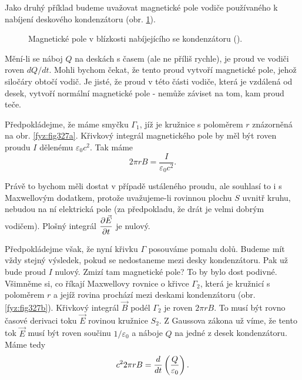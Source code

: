   Jako druhý příklad budeme uvažovat magnetické pole vodiče používaného k nabíjení deskového 
  kondenzátoru (obr. \ref{fyz:fig327}).
  
  \begin{figure}[hb!]  %
    \centering
     \newline
    \caption{Magnetické pole v blízkosti nabíjejícího se kondenzátoru 
             (\cite[s.~321]{Feynman02}).}
    \label{fyz:fig327}
  \end{figure}
  
  Mění-li se náboj \(Q\) na deskách s časem (ale ne příliš rychle), je proud ve vodiči roven 
  \(dQ/dt\). Mohli bychom čekat, že tento proud vytvoří magnetické pole, jehož siločáry obtočí 
  vodič. Je jisté, že proud v této části vodiče, která je vzdálená od desek, vytvoří normální 
  magnetické pole - nemůže záviset na tom, kam proud teče.
  
  Předpokládejme, že máme smyčku \(\Gamma_1\), jíž je kružnice s poloměrem \(r\) znázorněná na obr. 
  \ref{fyz:fig327a}. Křivkový integrál magnetického pole by měl být roven proudu \(I\) dělenému 
  \(\varepsilon_0c^2\). Tak máme
  \begin{equation}\label{fyz:eq445}
    2\pi r B = \frac{I}{\varepsilon_0c^2}.
  \end{equation}
  
  Právě to bychom měli dostat v případě ustáleného proudu, ale souhlasí to i s Maxwellovým 
  dodatkem, protože uvažujeme-li rovinnou plochu \(S\) uvnitř kruhu, nebudou na ní elektrická pole 
  (za předpokladu, že drát je velmi dobrým vodičem). Plošný integrál \(\dfrac{\partial \vec{E}}{\partial t}\) je 
  nulový.
  
  Předpokládejme však, že nyní křivku \(\Gamma\) posouváme pomalu dolů. Budeme mít vždy stejný 
  výsledek, pokud se nedostaneme mezi desky kondenzátoru. Pak už bude proud \(I\) nulový. Zmizí tam 
  magnetické pole? To by bylo dost podivné. Všimněme si, co říkají Maxwellovy rovnice o křivce 
  \(\Gamma_2\), která je kružnicí s poloměrem \(r\) a jejíž rovina prochází mezi deskami 
  kondenzátoru (obr. \ref{fyz:fig327b}). Křivkový integrál \(\vec{B}\) podél \(\Gamma_2\) je roven 
  \(2\pi rB\). To musí být rovno časové derivaci toku \(\vec{E}\) rovinou kružnice \(S_2\). Z 
  Gaussova zákona už víme, že tento tok \(\vec{E}\) musí být roven součinu \(1/\varepsilon_0\) a 
  náboje \(Q\) na jedné z desek kondenzátoru. Máme tedy
  \begin{equation}\label{fyz:eq446}
    c^22\pi r B = \dfrac{d }{d t}\left(\frac{Q}{\varepsilon_0}\right).
  \end{equation}
  
